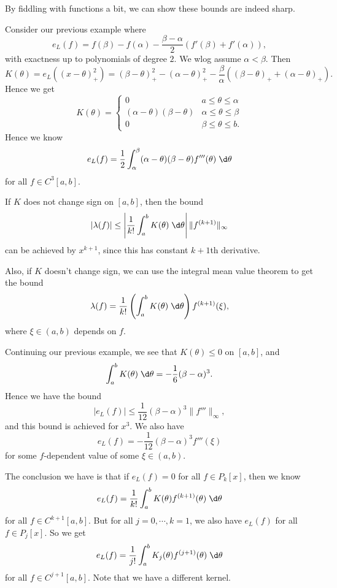 \documentclass[a4paper]{article}
\begin{document}
By fiddling with functions a bit, we can show these bounds are indeed sharp.

\begin{eg}
  Consider our previous example where
  \[
    e_L(f) = f(\beta) - f(\alpha) - \frac{\beta - \alpha}{2} (f'(\beta) + f'(\alpha)),
  \]
  with exactness up to polynomials of degree $2$. We wlog assume $\alpha < \beta$. Then
  \[
    K(\theta) = e_L((x - \theta)_+^2) = (\beta - \theta)_+^2 - (\alpha - \theta)_+^2 - \frac{\beta}{\alpha}((\beta - \theta)_+ + (\alpha - \theta)_+).
  \]
  Hence we get
  \[
    K(\theta) =
    \begin{cases}
      0 & a \leq \theta \leq \alpha\\
      (\alpha - \theta)(\beta - \theta) & \alpha \leq \theta \leq \beta\\
      0 & \beta \leq \theta \leq b.
    \end{cases}
  \]
  Hence we know
  \[
    e_L(f) = \frac{1}{2}\int_\alpha^\beta (\alpha - \theta)(\beta - \theta) f'''(\theta) \;\d \theta
  \]
  for all $f \in C^3[a, b]$.
\end{eg}

If $K$ does not change sign on $[a, b]$, then the bound
\[
  |\lambda(f)| \leq \left|\frac{1}{k!} \int_a^b K(\theta) \;\d \theta\right| \|f^{(k + 1)}\|_\infty
\]
can be achieved by $x^{k + 1}$, since this has constant $k + 1$th derivative.

Also, if $K$ doesn't change sign, we can use the integral mean value theorem to get the bound
\[
  \lambda (f) = \frac{1}{k!} \left(\int_a^b K(\theta)\;\d \theta\right) f^{(k + 1)}(\xi),
\]
where $\xi \in (a, b)$ depends on $f$.

\begin{eg}
  Continuing our previous example, we see that $K(\theta) \leq 0$ on $[a, b]$, and
  \[
    \int_a^b K(\theta)\;\d \theta = -\frac{1}{6}(\beta - \alpha)^3.
  \]
  Hence we have the bound
  \[
    |e_L(f)| \leq \frac{1}{12}(\beta - \alpha)^3 \|f'''\|_{\infty},
  \]
  and this bound is achieved for $x^3$. We also have
  \[
    e_L(f) = -\frac{1}{12}(\beta - \alpha)^3 f'''(\xi)
  \]
  for some $f$-dependent value of some $\xi \in (a, b)$.
\end{eg}

The conclusion we have is that if $e_L(f) = 0$ for all $f \in P_k[x]$, then we know
\[
  e_L(f) = \frac{1}{k!} \int_a^b K(\theta) f^{(k + 1)}(\theta)\;\d \theta
\]
for all $f \in C^{k + 1}[a, b]$. But for all $j = 0, \cdots, k = 1$, we also have $e_L(f)$ for all $f \in P_j[x]$. So we get
\[
  e_L(f) = \frac{1}{j!} \int_a^b K_j (\theta) f^{(j + 1)}(\theta)\;\d \theta
\]
for all $f \in C^{j + 1}[a, b]$. Note that we have a different kernel.
\end{document}
